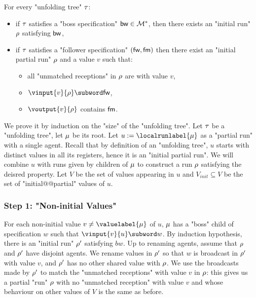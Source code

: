 \begin{lemma}
\label{lem:tree-to-run-technical}
For every "unfolding tree" $\tau$:
\begin{itemize}
	\item if $\tau$ satisfies a "boss specification" $\mathsf{bw} \in \mathcal{M}^*$, then there exists an "initial run" $\rho$ satisfying $\mathsf{bw}$,
	\item if $\tau$ satisfies a "follower specification" $(\mathsf{fw}, \mathsf{fm})$ then there exist an "initial partial run" $\rho$ and a value $v$ such that:
	\begin{itemize}
	\item all "unmatched receptions" in $\rho$ are with value $v$,
	\item $\vinput{v}{\run} \subword \followwordspec$, 
	\item $\voutput{v}{\run}$ contains $\mathsf{fm}$.
	\end{itemize}
\end{itemize}
\end{lemma}

We prove it by induction on the "size" of the "unfolding tree".
Let $\tau$ be a "unfolding tree", let $\mu$ be its root.
Let $u := \localrunlabel{\node}$ as a "partial run" with a single agent. Recall that by definition of an "unfolding tree", $u$ starts with distinct values in all its registers, hence it is an "initial partial run".
We will combine $u$ with runs given by children of $\mu$ to construct a run $\rho$ satisfying the deisred property.
Let $V$ be the set of values appearing in $u$ and $V_{init} \subseteq V$ be the set of "initial@@partial" values of $u$.

\subsubsection{Step 1: "Non-initial Values"}
\label{sec:tree-to-run-step-one}

For each non-initial value $v \ne \valuelabel{\node}$ of $u$, $\mu$ has a "boss" child of specification $w$ such that $\vinput{v}{u} \subword w$.
By induction hypothesis, there is an "initial run" $\rho'$ satisfying $bw$. Up to renaming agents, assume that $\rho$ and $\rho'$ have disjoint agents.
We rename values in $\rho'$ so that $w$ is broadcast in $\rho'$ with value $v$, and $\rho'$ has no other shared value with $\rho$. 
We use the broadcasts made by $\rho'$ to match the "unmatched receptions" with value $v$ in $\rho$: this gives us a partial "run" $\rho$ with no "unmatched reception" with value $v$ and whose behaviour on other values of $V$ is the same as before.

